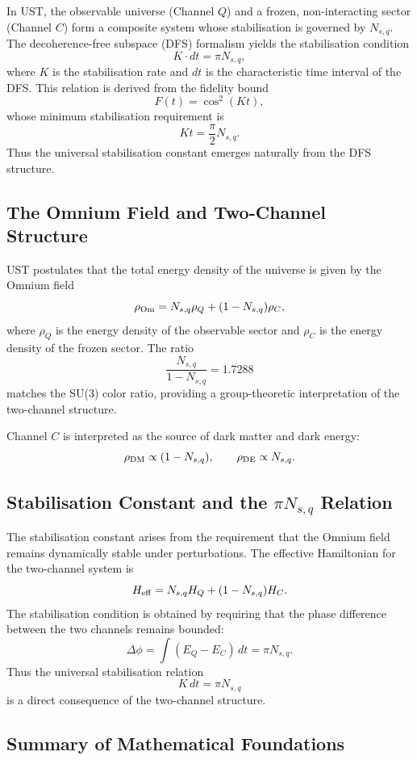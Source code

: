 \documentclass[12pt]{article}
\begin{document}
In UST, the observable universe (Channel $Q$) and a frozen, non-interacting
sector (Channel $C$) form a composite system whose stabilisation is governed
by $N_{s,q}$. The decoherence-free subspace (DFS) formalism yields the
stabilisation condition
\[
K \cdot dt = \pi N_{s,q},
\]
where $K$ is the stabilisation rate and $dt$ is the characteristic time
interval of the DFS. This relation is derived from the fidelity bound
\[
F(t) = \cos^2(Kt),
\]
whose minimum stabilisation requirement is
\[
Kt = \frac{\pi}{2}N_{s,q}.
\]
Thus the universal stabilisation constant emerges naturally from the DFS
structure.

\subsection{The Omnium Field and Two-Channel Structure}

UST postulates that the total energy density of the universe is given by the
Omnium field
\[
\rho_{\rm Om} = N_{s,q}\rho_Q + (1-N_{s,q})\rho_C,
\]
where $\rho_Q$ is the energy density of the observable sector and $\rho_C$ is
the energy density of the frozen sector. The ratio
\[
\frac{N_{s,q}}{1-N_{s,q}} = 1.7288
\]
matches the SU(3) color ratio, providing a group-theoretic interpretation of
the two-channel structure.

Channel $C$ is interpreted as the source of dark matter and dark energy:
\[
\rho_{\rm DM} \propto (1-N_{s,q}), \qquad
\rho_{\rm DE} \propto N_{s,q}.
\]

\subsection{Stabilisation Constant and the $\pi N_{s,q}$ Relation}

The stabilisation constant arises from the requirement that the Omnium field
remains dynamically stable under perturbations. The effective Hamiltonian for
the two-channel system is
\[
H_{\rm eff} = N_{s,q}H_Q + (1-N_{s,q})H_C.
\]
The stabilisation condition is obtained by requiring that the phase difference
between the two channels remains bounded:
\[
\Delta\phi = \int (E_Q - E_C)\,dt = \pi N_{s,q}.
\]
Thus the universal stabilisation relation
\[
K\,dt = \pi N_{s,q}
\]
is a direct consequence of the two-channel structure.

\subsection{Summary of Mathematical Foundations}
\end{document}
